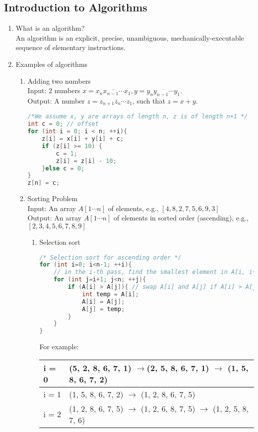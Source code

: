 \documentclass[11pt]{article}
\begin{document}
\subsection{Introduction to Algorithms}
\begin{enumerate}
\item What is an algorithm?\\
An algorithm is an explicit, precise, unambiguous, mechanically-executable sequence of elementary instructions.
\item Examples of algorithms
\begin{enumerate}
\item Adding two numbers\\
Input: 2 numbers $x = \overline{x_{n} x_{n-1} \cdots x_{1}}, y = \overline{y_{n} y_{n-1} \cdots y_{1}}$.\\
Output: A number $z= \overline{z_{n+1} z_{n} \cdots z_{1}}$, such that $z = x+y$.
\begin{lstlisting}[language = C++]
/*We assume x, y are arrays of length n, z is of length n+1 */
int c = 0; // offset
for (int i = 0; i < n; ++i){
	z[i] = x[i] + y[i] + c;
	if (z[i] >= 10) {
		c = 1;
		z[i] = z[i] - 10;	
	}else c = 0;
}
z[n] = c;
\end{lstlisting}
\item Sorting Problem\\
Input: An array $A[1 \cdots n]$ of elements, e.g., $[4, 8, 2, 7, 5, 6, 9, 3]$\\
Output: An array $A[1 \cdots n]$ of elements in sorted order (ascending), e.g., $[2, 3, 4, 5, 6, 7, 8, 9]$
\begin{enumerate}
\item Selection sort
\begin{lstlisting}[language = C++]
/* Selection sort for ascending order */
for (int i=0; i<n-1; ++i){ 
	// in the i-th pass, find the smallest element in A[i, i+2, ..., n] and swap it with A[i]
	for (int j=i+1; j<n; ++j){
		if (A[i] > A[j]){ // swap A[i] and A[j] if A[i] > A[j]
			int temp = A[i];
			A[i] = A[j];
			A[j] = temp;	
		}	
	}
}
\end{lstlisting}
For example:\\
\begin{tabular}{|l|l|}
\hline
i = 0& (5, 2, 8, 6, 7, 1) $\rightarrow$(2, 5, 8, 6, 7, 1) $\rightarrow$ (1, 5, 8, 6, 7, 2)\\
\hline
i = 1& (1, 5, 8, 6, 7, 2) $\rightarrow$ (1, 2, 8, 6, 7, 5)\\
\hline
i = 2& (1, 2, 8, 6, 7, 5) $\rightarrow$ (1, 2, 6, 8, 7, 5) $\rightarrow$ (1, 2, 5, 8, 7, 6)\\

\end{tabular}
\end{enumerate}
\end{enumerate}
\end{enumerate}
\end{document}
